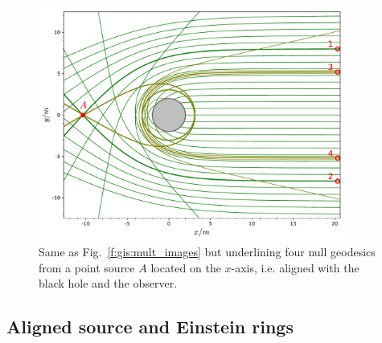 \begin{figure}
\centerline{\includegraphics[width=0.9\textwidth]{ges_images_aligned.pdf}}
\caption[]{\label{f:gis:images_aligned} \footnotesize
Same as Fig.~\ref{f:gis:mult_images} but underlining four null geodesics
from a point source $A$ located on the $x$-axis, i.e.
aligned with the black hole and the observer.}
\end{figure}


\subsection{Aligned source and Einstein rings}

